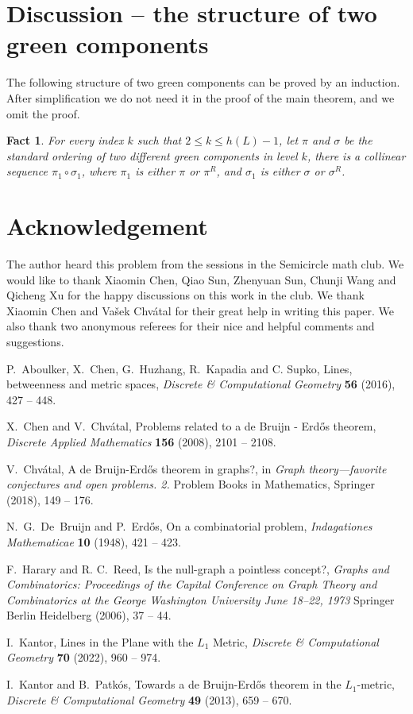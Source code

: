 \documentclass[12pt]{article}
\newtheorem{fact}{Fact}
\begin{document}
\section{Discussion -- the structure of two green components}

The following structure of two green components can be proved by an induction.
After simplification we do not need it in the proof of the main theorem, and
we omit the proof.

\begin{fact}\label{fact.P_line_plus}
For every index $k$ such that $2 \le  k \le h(L)-1$, let $\pi$ and $\sigma$
be the standard ordering of two different green components in 
level $k$,
there is a collinear sequence $\pi_1 \circ \sigma_1$,
where $\pi_1$ is either $\pi$ or $\pi^R$,
and $\sigma_1$ is either $\sigma$ or $\sigma^R$.
\end{fact}

\section*{Acknowledgement}

The author heard this problem from the sessions in the Semicircle math club.
We would like to thank Xiaomin Chen, Qiao Sun, Zhenyuan Sun, Chunji Wang and Qicheng Xu
for the happy discussions on this work in the club.
We thank Xiaomin Chen and Va\v{s}ek Chv\'atal for their
great help in writing this paper.
We also thank two anonymous referees for their nice and 
helpful comments and suggestions.

\begin{thebibliography}{10}

P.~Aboulker, X.~Chen, G.~Huzhang, R.~Kapadia and C. Supko,
Lines, betweenness and metric spaces,
{\em Discrete \& Computational Geometry\/} {\bf 56} (2016),
427 -- 448.

X.~Chen and V.~Chv\'{a}tal,
Problems related to a de Bruijn - Erd\H os theorem,
{\em Discrete Applied Mathematics\/} {\bf 156} (2008),
  2101 -- 2108.

V.~Chv\'{a}tal,
A de Bruijn-Erd\H{o}s theorem in graphs?,
in {\em Graph theory—favorite conjectures and open problems. 2.\/} 
Problem Books in Mathematics, Springer (2018),
149 -- 176.

N.~G.~De~Bruijn and P.~Erd\H{o}s,
On a combinatorial problem,
{\em Indagationes Mathematicae\/} {\bf 10} (1948),
421 -- 423.

F.~Harary and R. C.~Reed,
Is the null-graph a pointless concept?,
{\em Graphs and Combinatorics: Proceedings of the Capital Conference on Graph Theory and Combinatorics at the George Washington University June 18–22, 1973\/} Springer Berlin Heidelberg (2006),
37 -- 44.

I.~Kantor,
Lines in the Plane with the $L_1$ Metric,
{\em Discrete \& Computational Geometry\/} {\bf 70} (2022),
960 -- 974.

I.~Kantor and B.~Patk\'os,
Towards a de Bruijn-Erd\H{o}s theorem in the $L_1$-metric,
{\em Discrete \& Computational Geometry\/} {\bf 49} (2013),
659 -- 670.

\end{thebibliography}
\end{document}
